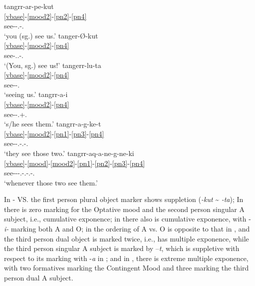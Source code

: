 \documentclass[output=paper]{langscibook}
\begin{document}
\ea\label{ex:key:48}
\ea\label{ex:key:48a}
\glll tangrr-ar-pe-kut\\
    \ref{vbase}-\ref{mood2}-\ref{pn2}-\ref{pn4} \\
     see-\Ind{}-\Ssg.\Aarg{}-\Fpl.\Obj{}\\
\glt `you (sg.) see us.'
\ex\label{ex:key:48b}
\glll tanger-Ø-kut\\
    \ref{vbase}-\ref{mood2}-\ref{pn4} \\
     see-\Opt.\Ssg.\Aarg{}-\Fpl.\Obj{}\\
\glt `(You, sg.) see us!'
\ex\label{ex:key:48c}
\glll tangerr-lu-ta\\
    \ref{vbase}-\ref{mood2}-\ref{pn4} \\
     see-\Appos-\Fpl.\Obj{}\\
\glt `seeing us.'
\ex\label{ex:key:48d}
\glll tangrr-a-i\\
    \ref{vbase}-\ref{mood2}-\ref{pn4}\\
     see-\Ind{}-\Tsg.\Aarg{}+\Tpl.\Obj{}\\
\glt `s/he sees them.'
\ex\label{ex:key:48e}
\glll tangrr-a-g-ke-t\\
    \ref{vbase}-\ref{mood2}-\ref{pn1}-\ref{pn3}-\ref{pn4}\\
     see-\Ind{}-\Third\Du.\Obj{}-\Third\Du.\Obj{}-\Tpl.\Aarg{}\\
\glt `they see those two.'
\ex\label{ex:key:48f}
\glll tangrr-aq-a-ne-g-ne-ki\\
    \ref{vbase}-\ref{mood}-\ref{mood2}-\ref{pn1}-\ref{pn2}-\ref{pn3}-\ref{pn4}\\
     see-\Cntg-\Cntg-\Third\Du.\Aarg{}-\Third\Du.\Aarg{}-\Third\Du.\Aarg{}-\Tpl.\Obj{}\\
\glt `whenever those two see them.'\\
\z
\z

In - VS.  the first person plural object marker shows suppletion (\textit{{}-kut} {\textasciitilde} \textit{{}-ta}); In  there is zero marking for the Optative mood and the second person singular A subject, i.e., cumulative exponence; in  there also is cumulative exponence, with -\textit{i-} marking both A and O; in  the ordering of A vs. O is opposite to that in , and the third person dual object is marked twice, i.e., has multiple exponence, while the third person singular A subject is marked by –\textit{t}, which is suppletive with respect to its marking with -\textit{a} in ; and in , there is extreme multiple exponence, with two formatives marking the Contingent Mood and three marking the third person dual A subject.
\end{document}
